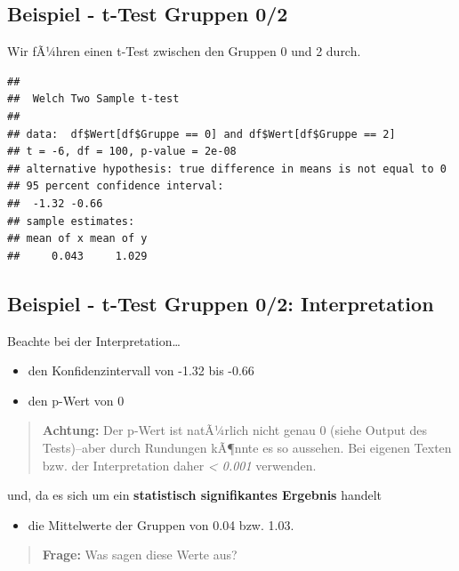 \documentclass[
]{book}
\providecommand{\tightlist}{%
  \setlength{\itemsep}{0pt}\setlength{\parskip}{0pt}}
\begin{document}
\hypertarget{beispiel---t-test-gruppen-02}{%
\subsection{Beispiel - t-Test Gruppen 0/2}\label{beispiel---t-test-gruppen-02}}

Wir fÃ¼hren einen t-Test zwischen den Gruppen 0 und 2 durch.

\begin{verbatim}
## 
##  Welch Two Sample t-test
## 
## data:  df$Wert[df$Gruppe == 0] and df$Wert[df$Gruppe == 2]
## t = -6, df = 100, p-value = 2e-08
## alternative hypothesis: true difference in means is not equal to 0
## 95 percent confidence interval:
##  -1.32 -0.66
## sample estimates:
## mean of x mean of y 
##     0.043     1.029
\end{verbatim}

\hypertarget{beispiel---t-test-gruppen-02-interpretation}{%
\subsection{Beispiel - t-Test Gruppen 0/2: Interpretation}\label{beispiel---t-test-gruppen-02-interpretation}}

Beachte bei der Interpretation\ldots{}

\begin{itemize}
\tightlist
\item
  den Konfidenzintervall von -1.32 bis -0.66
\item
  den p-Wert von 0
\end{itemize}

\begin{quote}
\textbf{Achtung:} Der p-Wert ist natÃ¼rlich nicht genau 0 (siehe Output des Tests)--aber durch Rundungen kÃ¶nnte es so aussehen. Bei eigenen Texten bzw. der Interpretation daher \emph{\textless{} 0.001} verwenden.
\end{quote}

und, da es sich um ein \textbf{statistisch signifikantes Ergebnis} handelt

\begin{itemize}
\tightlist
\item
  die Mittelwerte der Gruppen von 0.04 bzw. 1.03.
\end{itemize}

\begin{quote}
\textbf{Frage:} Was sagen diese Werte aus?
\end{quote}
\end{document}
